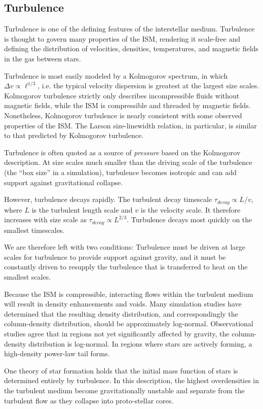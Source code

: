 \subsection{Turbulence}
Turbulence is one of the defining features of the interstellar medium.
Turbulence is thought to govern many properties of the ISM, rendering it
scale-free and defining the distribution of velocities, densities,
temperatures, and magnetic fields in the gas between stars.

Turbulence is most easily modeled by a Kolmogorov spectrum, in which $\Delta v
\propto \ell^{1/3}$, i.e. the typical velocity dispersion is greatest at the
largest size scales.  Kolmogorov turbulence strictly only describes
incompressible fluids without magnetic fields, while the ISM is compressible
and threaded by magnetic fields.  Nonetheless, Kolmogorov turbulence is nearly
consistent with some observed properties of the ISM.  The Larson size-linewidth
relation, in particular, is similar to that predicted by Kolmogorov turbulence.

Turbulence is often quoted as a source of \emph{pressure} based on the
Kolmogorov description.  At size scales much smaller than the driving scale of
the turbulence (the ``box size'' in a simulation), turbulence becomes isotropic
and can add support against gravitational collapse.  

However, turbulence decays rapidly.  The turbulent decay timescale
$\tau_{decay}\propto L / v$, where $L$ is the turbulent length scale and $v$ is
the velocity scale.  It therefore increases with size scale as
$\tau_{decay}\propto L^{2/3}$.  Turbulence decays most quickly on the smallest
timescales.

We are therefore left with two conditions: Turbulence must be driven at large
scales for turbulence to provide support against gravity, and it must be
constantly driven to resupply the turbulence that is transferred to heat on the
smallest scales.

Because the ISM is compressible, interacting flows within the turbulent medium
will result in density enhancements and voids.  Many simulation studies have
determined that the resulting density distribution, and correspondingly the
column-density distribution, should be approximately log-normal.  Observational
studies agree that in regions not yet significantly affected by gravity, the 
column-density distribution is log-normal.  In regions where stars are actively
forming, a high-density power-law tail forms.

One theory of star formation holds that the initial mass function of stars is
determined entirely by turbulence.  In this description, the highest
overdensities in the turbulent medium become gravitationally unstable and
separate from the turbulent flow as they collapse into proto-stellar cores.

